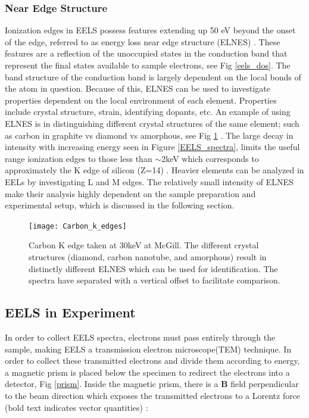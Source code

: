 \subsubsection{Near Edge Structure}
Ionization edges in EELS possess features extending up 50 eV beyond the onset of the edge, referred to as energy loss near edge structure (ELNES) \cite{Egerton}.   These features are a reflection of the unoccupied states in the conduction band that represent the final states available to sample electrons, see Fig \ref{eels_dos}.  The band structure of the conduction band is largely dependent on the local bonds of the atom in question.  Because of this, ELNES can be used to investigate properties dependent on the local environment of each element.   Properties include crystal structure, strain, identifying dopants, etc\cite{torrisi_atomic_2016}.  An example of using ELNES is in distinguishing different crystal structures of the same element; such as carbon in graphite vs diamond vs amorphous, see Fig \ref{carbon-k-edge} \cite{hamon_elnes_2004}.     The large decay in intensity with increasing energy seen in Figure \ref{EELS_spectra}, limits the useful range ionization edges to those less than $\sim$2keV which corresponds to approximately the K edge of silicon (Z=14) \cite{reimer_transmission_2008}. Heavier elements can be analyzed in EELs by investigating L and M edges.   The relatively small intensity of ELNES make their analysis highly dependent on the sample preparation and experimental setup, which is discussed in the following section.  \\


\begin{figure}
	\centering
	\texttt{[image: Carbon\_k\_edges]}
	\caption{Carbon K edge taken at 30keV at McGill. The different crystal structures (diamond, carbon nanotube, and amorphous) result in distinctly different ELNES which can be used for identification. The spectra have separated with a vertical offset to facilitate comparison. }
	\label{carbon-k-edge}
\end{figure}


\subsection{EELS in Experiment}

In order to collect EELS spectra, electrons must pass entirely through the sample, making EELS a transmission electron microscope(TEM) technique\cite{Egerton}. In order to collect these transmitted electrons and divide them according to energy, a magnetic prism is placed below the specimen to redirect the electrons into a detector,  Fig \ref{prism}.  Inside the magnetic prism, there is a $\mathrm{\textbf{B}}$ field perpendicular to the beam direction which exposes the transmitted electrons to a Lorentz force (bold text indicates vector quantities) \cite{griffiths_em}: 


